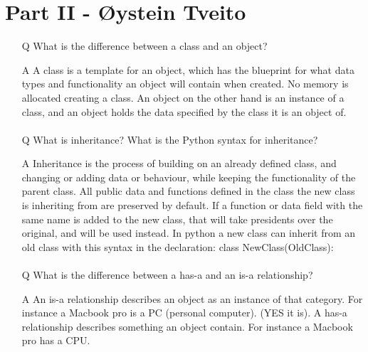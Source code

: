 \documentclass{article}
\begin{document}
\section{Part II - Øystein Tveito}
\begin{itemize}
\item[Q] 
What is the difference between a class and an object?
\item[A]
A class is a template for an object, which has the blueprint for what data types and functionality an object will contain when created. No memory is allocated creating a class. An object on the other hand is an instance of a class, and an object holds the data specified by the class it is an object of.
\paragraph{}
\item[Q] 
What is inheritance? What is the Python syntax for inheritance?
\item[A]
Inheritance is the process of building on an already defined class, and changing or adding data or behaviour, while keeping the functionality of the parent class. All public data and functions defined in the class the new class is inheriting from are preserved by default. If a function or data field with the same name is added to the new class, that will take presidents over the original, and will be used instead. In python a new class can inherit from an old class with this syntax in the declaration: class NewClass(OldClass):
\paragraph{}
\item[Q]
What is the difference between a has-a and an is-a relationship?
\item[A]
An is-a relationship describes an object as an instance of that category. For instance a Macbook pro is a PC (personal computer). (YES it is).
A has-a relationship describes something an object contain. For instance a Macbook pro has a CPU.

\end{itemize}
\end{document}
